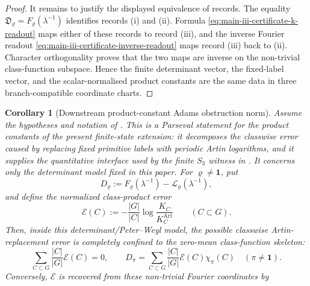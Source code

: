 \documentclass[11pt,a4paper]{amsart}
\theoremstyle{plain}
\newtheorem{corollary}[theorem]{Corollary}
\theoremstyle{definition}
\theoremstyle{remark}
\begin{document}
\begin{proof}
  It remains to justify the displayed equivalence of records.  The equality
  \(\mathfrak D_\varrho=F_\varrho(\lambda^{-1})\) identifies records
  \textup{(i)} and \textup{(ii)}.  Formula
  \eqref{eq:main-iii-certificate-k-readout} maps either of these records to
  record \textup{(iii)}, and the inverse Fourier readout
  \eqref{eq:main-iii-certificate-inverse-readout} maps record \textup{(iii)}
  back to \textup{(ii)}.  Character orthogonality proves that the two maps are
  inverse on the non-trivial class-function subspace.  Hence the finite
  determinant vector, the fixed-label vector, and the scalar-normalised product
  constants are the same data in three branch-compatible coordinate charts.
\end{proof}

\begin{corollary}[Downstream product-constant Adams obstruction norm]
  \label{thm:adams-obstruction-bound}
  \label{cor:adams-obstruction-bound}
  \label{thm:adams-obstruction-budget}
  \label{cor:adams-obstruction-budget}
  Assume the hypotheses and notation of
  .  This is a Parseval statement for
  the product constants of the present finite-state extension: it decomposes
  the classwise error caused by replacing fixed primitive labels with
  periodic Artin logarithms, and it supplies the quantitative interface used
  by the finite \(S_3\) witness in
  .
  It concerns only the determinant model fixed in this paper.  For
  \(\varrho\neq\mathbf1\), put
  \[
    D_\varrho
    :=F_\varrho(\lambda^{-1})-\mathcal L_\varrho(\lambda^{-1}),
  \]
  and define the normalized class-product error
  \[
    \mathcal E(C)
    :=-
      \frac{|G|}{|C|}
      \log\frac{K_C}{K_C^{\mathrm{Art}}}
      \qquad(C\subset G).
  \]
  Then, inside this determinant/Peter--Weyl model, the possible classwise
  Artin-replacement error is completely confined to the zero-mean
  class-function skeleton:
  \begin{equation}\label{eq:adams-obstruction-bound-zero-mean}
    \sum_{C\subset G}\frac{|C|}{|G|}\mathcal E(C)=0,
    \qquad
    D_\pi=
    \sum_{C\subset G}\frac{|C|}{|G|}\mathcal E(C)\chi_\pi(C)
    \quad(\pi\neq\mathbf1).
  \end{equation}
  Conversely, \(\mathcal E\) is recovered from these non-trivial Fourier
  coordinates by
  \begin{equation}\label{eq:adams-obstruction-bound-forward}

\end{equation}
\end{corollary}
\end{document}
